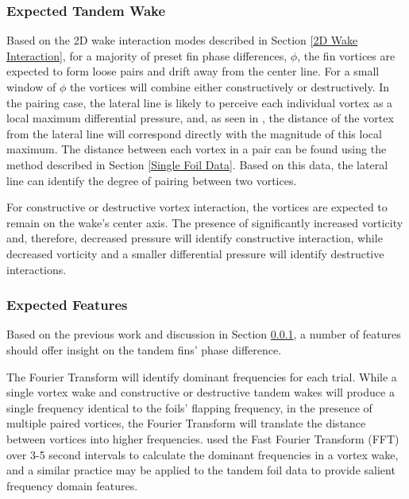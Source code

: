 
\subsubsection{Expected Tandem Wake} \label{Expected Tandem Wake}
    
    Based on the 2D wake interaction modes described in Section \ref{2D Wake Interaction}, for a majority of preset fin phase differences, \(\phi\), the fin vortices are expected to form loose pairs and drift away from the center line. For a small window of \(\phi\) the vortices will combine either constructively or destructively. In the pairing case, the lateral line is likely to perceive each individual vortex as a local maximum differential pressure, and, as seen in \citep{Chambers2014}, the distance of the vortex from the lateral line will correspond directly with the magnitude of this local maximum. The distance between each vortex in a pair can be found using the method described in Section \ref{Single Foil Data}. Based on this data, the lateral line can identify the degree of pairing between two vortices.
    
    For constructive or destructive vortex interaction, the vortices are expected to remain on the wake's center axis. The presence of significantly increased vorticity and, therefore, decreased pressure will identify constructive interaction, while decreased vorticity and a smaller differential pressure will identify destructive interactions.
    
\subsubsection{Expected Features} \label{Expected Features}
    
    Based on the previous work and discussion in Section \ref{Expected Tandem Wake}, a number of features should offer insight on the tandem fins' phase difference.
    
    The Fourier Transform will identify dominant frequencies for each trial. While a single vortex wake and constructive or destructive tandem wakes will produce a single frequency identical to the foils' flapping frequency, in the presence of multiple paired vortices, the Fourier Transform will translate the distance between vortices into higher frequencies. \citep{Venturelli2012} used the Fast Fourier Transform (FFT) over 3-5 second intervals to calculate the dominant frequencies in a vortex wake, and a similar practice may be applied to the tandem foil data to provide salient frequency domain features.
    
